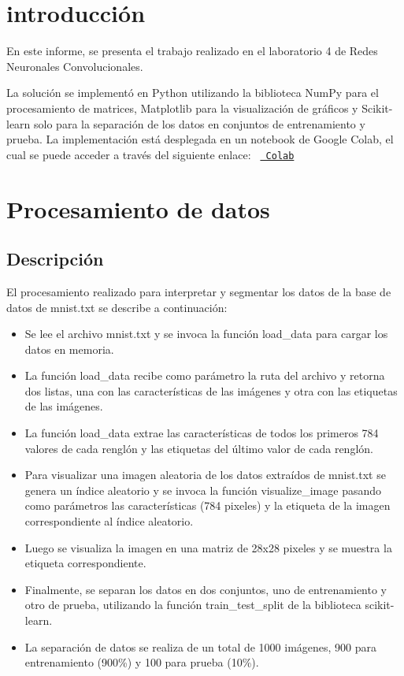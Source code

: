 \documentclass{article}
\begin{document}
    \section{introducción}\label{sec:introduccion}
    En este informe, se presenta el trabajo realizado en el laboratorio 4 de Redes Neuronales Convolucionales.

    \noindent
    La solución se implementó en Python utilizando la biblioteca NumPy para el procesamiento de matrices,
    Matplotlib para la visualización de gráficos y Scikit-learn solo para la separación de los datos en conjuntos de entrenamiento y prueba.
    La implementación está desplegada en un notebook de Google Colab, el cual se puede acceder a través del siguiente enlace:
    \texttt{%
        \href{https://drive.google.com/file/d/1G7FsF-o0YyQpEuUWFcWKjgZJbzFlSa0B/view?usp=sharing}{%
            Colab}%
    }


    \section{Procesamiento de datos}\label{sec:Procesamiento-de-datos}

    \subsection{Descripción}\label{subsec:descripcion}
    El procesamiento realizado para interpretar y segmentar los datos de la base de datos de mnist.txt se describe a continuación:
    \begin{itemize}
        \item Se lee el archivo mnist.txt y se invoca la función load\_data para cargar los datos en memoria.
        \item La función load\_data recibe como parámetro la ruta del archivo y retorna dos listas, una con las características de las imágenes y otra con las etiquetas de las imágenes.
        \item La función load\_data extrae las características de todos los primeros 784 valores de cada renglón y las etiquetas del último valor de cada renglón.
        \item Para visualizar una imagen aleatoria de los datos extraídos de mnist.txt se genera un índice aleatorio
        y se invoca la función visualize\_image pasando como parámetros las características (784 pixeles) y la etiqueta de la imagen correspondiente al índice aleatorio.
        \item Luego se visualiza la imagen en una matriz de 28x28 pixeles y se muestra la etiqueta correspondiente.
        \item Finalmente, se separan los datos en dos conjuntos, uno de entrenamiento y otro de prueba, utilizando la función train\_test\_split de la biblioteca scikit-learn.
        \item La separación de datos se realiza de un total de 1000 imágenes, 900 para entrenamiento (900\%) y 100 para prueba (10\%).
    \end{itemize}
\end{document}
